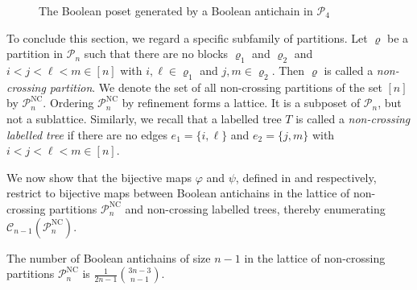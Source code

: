 \documentclass{preprint}
\newcommand{\cC}{\mathcal{C}}
\newcommand{\cP}{\mathcal{P}}
\theoremstyle{definition}
\begin{document}
\begin{figure}
    \centering
    \caption{\centering The Boolean poset generated by a Boolean antichain in $\cP_4$}
    \label{fig:Partition}
\end{figure}

To conclude this section, we regard a specific subfamily of partitions.
Let $\varrho$ be a partition in $\cP_n$ such that there are no blocks $\varrho_1$ and $\varrho_2$ and $i<j<\ell<m \in [n]$ with $i,\ell \in \varrho_1$ and $j,m \in \varrho_2$. Then $\varrho$ is called a \textit{non-crossing partition}. We denote the set of all non-crossing partitions of the set $[n]$ by $\cP_n^{\text{NC}}$. Ordering $\cP_n^{\text{NC}}$ by refinement forms a lattice. It is a subposet of $\cP_n$, but not a sublattice. Similarly, we recall that a labelled tree $T$ is called a \textit{non-crossing labelled tree} if there are no edges $e_1=\{i,\ell\}$ and $e_2=\{j,m\}$ with $i<j<\ell<m \in [n]$.

We now show that the bijective maps $\varphi$ and $\psi$, defined in  and  respectively, restrict to bijective maps between Boolean antichains in the lattice of non-crossing partitions $\cP_n^{\text{NC}}$ and non-crossing labelled trees, thereby enumerating $\cC_{n-1}(\cP_n^{\text{NC}})$.
\begin{corollary}
    The number of Boolean antichains of size $n-1$ in the lattice of non-crossing partitions $\cP_n^{\text{NC}}$ is $\frac{1}{2n-1} \binom{3n-3}{n-1}.$
\end{corollary}
\end{document}
